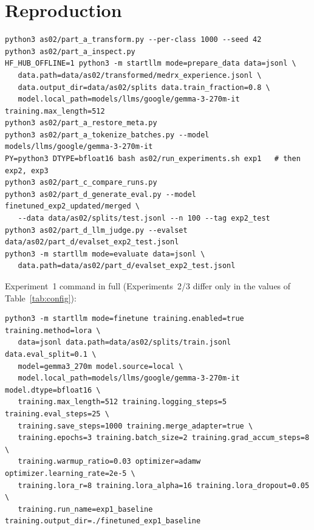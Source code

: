 \documentclass[11pt]{article}
\begin{document}
\appendix
\section{Reproduction}
\begin{footnotesize}
\begin{verbatim}
python3 as02/part_a_transform.py --per-class 1000 --seed 42
python3 as02/part_a_inspect.py
HF_HUB_OFFLINE=1 python3 -m startllm mode=prepare_data data=jsonl \
   data.path=data/as02/transformed/medrx_experience.jsonl \
   data.output_dir=data/as02/splits data.train_fraction=0.8 \
   model.local_path=models/llms/google/gemma-3-270m-it training.max_length=512
python3 as02/part_a_restore_meta.py
python3 as02/part_a_tokenize_batches.py --model models/llms/google/gemma-3-270m-it
PY=python3 DTYPE=bfloat16 bash as02/run_experiments.sh exp1   # then exp2, exp3
python3 as02/part_c_compare_runs.py
python3 as02/part_d_generate_eval.py --model finetuned_exp2_updated/merged \
   --data data/as02/splits/test.jsonl --n 100 --tag exp2_test
python3 as02/part_d_llm_judge.py --evalset data/as02/part_d/evalset_exp2_test.jsonl
python3 -m startllm mode=evaluate data=jsonl \
   data.path=data/as02/part_d/evalset_exp2_test.jsonl
\end{verbatim}
\end{footnotesize}
Experiment~1 command in full (Experiments~2/3 differ only in the values of Table~\ref{tab:config}):
\begin{footnotesize}
\begin{verbatim}
python3 -m startllm mode=finetune training.enabled=true training.method=lora \
   data=jsonl data.path=data/as02/splits/train.jsonl data.eval_split=0.1 \
   model=gemma3_270m model.source=local \
   model.local_path=models/llms/google/gemma-3-270m-it model.dtype=bfloat16 \
   training.max_length=512 training.logging_steps=5 training.eval_steps=25 \
   training.save_steps=1000 training.merge_adapter=true \
   training.epochs=3 training.batch_size=2 training.grad_accum_steps=8 \
   training.warmup_ratio=0.03 optimizer=adamw optimizer.learning_rate=2e-5 \
   training.lora_r=8 training.lora_alpha=16 training.lora_dropout=0.05 \
   training.run_name=exp1_baseline training.output_dir=./finetuned_exp1_baseline
\end{verbatim}
\end{footnotesize}
\end{document}
